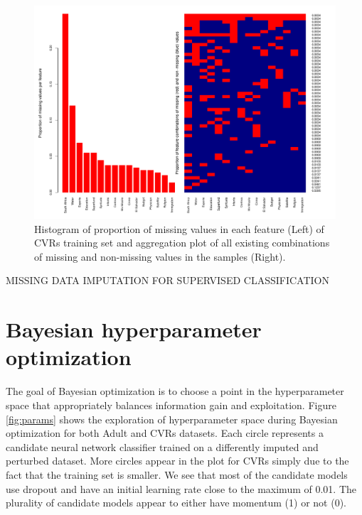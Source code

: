 \documentclass[10pt]{book}
\theoremstyle{definition}
\begin{document}
\begin{figure}[h!]
\includegraphics [scale=0.45]{figure/proportion-missing-votes.pdf}\par
\caption{\footnotesize Histogram of proportion of missing values in each feature (Left) of CVRs training set and aggregation plot of all existing combinations of missing and non-missing values in the samples (Right).}
 \label{fig:proportion-missing-votes}
\end{figure}

\clearpage
{}
{\hfill {\footnotesize\rm MISSING DATA IMPUTATION FOR SUPERVISED CLASSIFICATION} \hfill}

\section{Bayesian hyperparameter optimization}
\setcounter{equation}{0}

The goal of Bayesian optimization is to choose a point in the hyperparameter space that appropriately balances information gain and exploitation. Figure \ref{fig:params} shows the exploration of hyperparameter space during Bayesian optimization for both Adult and CVRs datasets. Each circle represents a candidate neural network classifier trained on a differently imputed and perturbed dataset. More circles appear in the plot for CVRs simply due to the fact that the training set is smaller. We see that most of the candidate models use dropout and have an initial learning rate close to the maximum of 0.01. The plurality of candidate models appear to either have momentum (1) or not (0).
\end{document}
